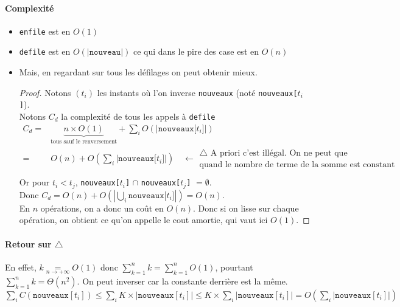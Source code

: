 \paragraph{Complexité}
\begin{itemize}[label=$\star$]
	\item \texttt{enfile} est en $O(1)$
	\item \texttt{defile} est en $O(|\texttt{nouveau}|)$ ce qui dans le pire des case est en $O(n)$
	\item Mais, en regardant sur tous les défilages on peut obtenir mieux.\\
	\begin{proof}
		Notons $(t_i)$ les instants où l'on inverse \texttt{nouveaux} (noté \texttt{nouveaux[$t_i$]}).\\
		Notons $C_d$ la complexité de tous les appels à \texttt{defile}
		$$
		\begin{array}{rl}
			C_d = & \underset{\text{tous sauf le renversement}}{\underbrace{n \times O(1)}} + \sum\limits_i O(|\texttt{nouveaux[$t_i$]}|)\\
			= & O(n) + O\left(\sum\limits_i |\texttt{nouveaux[$t_i$]}|\right) \quad \leftarrow \begin{array}{l}
					\triangle \text{ A priori c'est illégal. On ne peut que}\\
					\text{quand le nombre de terme de la somme est constant}
				\end{array} \\
		\end{array}
		$$
	Or pour $t_i < t_j$, \texttt{nouveaux[$t_i$]} $\cap$ \texttt{nouveaux[$t_j$]} $= \emptyset$.\\
	Donc $C_d = O(n) + O\left( \left| \bigcup\limits_i \texttt{nouveaux[$t_i$]} \right| \right) = O(n)$.\\
	En $n$ opérations, on a donc un coût en $O(n)$. Donc si on lisse sur chaque opération, on obtient ce qu'on appelle le cout amortie, qui vaut ici $O(1)$.
	\end{proof}
\end{itemize}

\paragraph{Retour sur $\triangle$} En effet, $k \underset{n\to +\infty}{=} O(1)$ donc $\sum\limits_{k=1}^n k = \sum\limits_{k=1}^n O(1)$, pourtant $\sum\limits_{k=1}^n k = \Theta(n^2)$. On peut inverser car la constante derrière est la même.\\
$\sum\limits_i C(\texttt{nouveaux}[t_i]) \leq \sum_i K \times \left| \texttt{nouveaux}[t_i] \right| \leq K \times \sum_i \left| \texttt{nouveaux}[t_i] \right| = O\left( \sum_i \left|\texttt{nouveaux}[t_i] \right| \right)$

